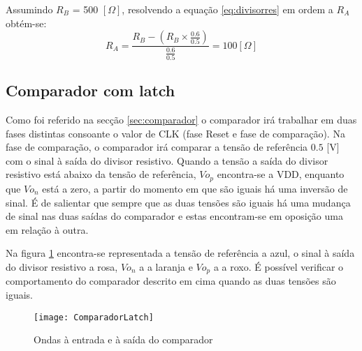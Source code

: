\documentclass[12pt]{article}
\begin{document}
Assumindo $R_B$ = 500 $[\Omega]$, resolvendo a equação \ref{eq:divisorres} em ordem a $R_A$ obtém-se: 
\begin{equation}
 R_A = \frac{R_B - (R_B \times \frac{0.6}{0.5})}{\frac{0.6}{0.5}} = 100 [\Omega]
\end{equation} 

\subsection{Comparador com latch}



Como foi referido na secção \ref{sec:comparador} o comparador irá trabalhar em duas fases distintas consoante o valor de CLK (fase Reset e fase de comparação). Na fase de comparação, o comparador irá comparar a tensão de referência $ 0.5 $ [V] com o sinal à saída do divisor resistivo. Quando a tensão a saída do divisor resistivo está abaixo da tensão de referência, $Vo_{p}$ encontra-se a VDD, enquanto que $Vo_{n}$ está a zero, a partir do momento em que são iguais há uma inversão de sinal. É de salientar que sempre que as duas tensões são iguais há uma mudança de sinal nas duas saídas do comparador e estas encontram-se em oposição uma em relação à outra. 

Na figura \ref{fig:saida_c_latch} encontra-se representada a tensão de referência a azul, o sinal à saída do divisor resistivo a rosa, $Vo_{n}$ a a laranja e $Vo_{p}$ a  a roxo. É possível verificar o comportamento do comparador descrito em cima quando as duas tensões são iguais.  

\begin{figure}[htbp]
	\centering
	\texttt{[image: ComparadorLatch]}
	\caption{Ondas à entrada e à saída do comparador }
	\label{fig:saida_c_latch}
\end{figure}
  
\end{document}

